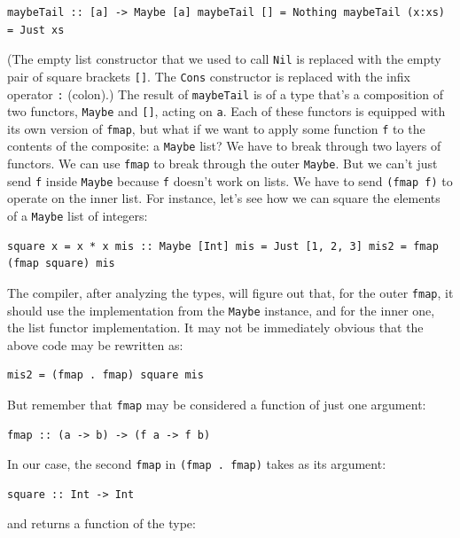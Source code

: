 \begin{verbatim}
maybeTail :: [a] -> Maybe [a] maybeTail [] = Nothing maybeTail (x:xs) = Just xs
\end{verbatim}

(The empty list constructor that we used to call \texttt{Nil} is
replaced with the empty pair of square brackets \texttt{{[}{]}}. The
\texttt{Cons} constructor is replaced with the infix operator \texttt{:}
(colon).) The result of \texttt{maybeTail} is of a type that's a
composition of two functors, \texttt{Maybe} and \texttt{{[}{]}}, acting
on \texttt{a}. Each of these functors is equipped with its own version
of \texttt{fmap}, but what if we want to apply some function \texttt{f}
to the contents of the composite: a \texttt{Maybe} list? We have to
break through two layers of functors. We can use \texttt{fmap} to break
through the outer \texttt{Maybe}. But we can't just send \texttt{f}
inside \texttt{Maybe} because \texttt{f} doesn't work on lists. We have
to send \texttt{(fmap\ f)} to operate on the inner list. For instance,
let's see how we can square the elements of a \texttt{Maybe} list of
integers:

\begin{verbatim}
square x = x * x mis :: Maybe [Int] mis = Just [1, 2, 3] mis2 = fmap (fmap square) mis
\end{verbatim}

The compiler, after analyzing the types, will figure out that, for the
outer \texttt{fmap}, it should use the implementation from the
\texttt{Maybe} instance, and for the inner one, the list functor
implementation. It may not be immediately obvious that the above code
may be rewritten as:

\begin{verbatim}
mis2 = (fmap . fmap) square mis
\end{verbatim}

But remember that \texttt{fmap} may be considered a function of just one
argument:

\begin{verbatim}
fmap :: (a -> b) -> (f a -> f b)
\end{verbatim}

In our case, the second \texttt{fmap} in \texttt{(fmap\ .\ fmap)} takes
as its argument:

\begin{verbatim}
square :: Int -> Int
\end{verbatim}

and returns a function of the type:

